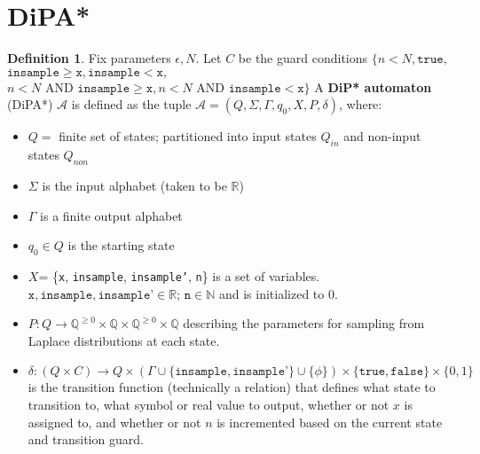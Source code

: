 \documentclass[12pt]{article}
\newcommand{\NN}{\mathbb{N}}
\newcommand{\QQ}{\mathbb{Q}}
\newcommand{\RR}{\mathbb{R}}
\newcommand{\gguard}{\texttt{insample}\geq \texttt{x}}
\newcommand{\lguard}{\texttt{insample} < \texttt{x}}
\newcommand{\gaguard}{n<N \text{ AND } \texttt{insample} \geq \texttt{x}}
\newcommand{\laguard}{n<N\text{ AND }\texttt{insample} < \texttt{x}}
\theoremstyle{definition}
\newtheorem{defn}[thm]{Definition}
\begin{document}
\section{DiPA*}

\begin{defn} Fix parameters $\epsilon, N$. Let $C$ be the guard conditions $\{n<N,\texttt{true},$ $\gguard, \lguard,$ $\gaguard, \laguard \}$ A \textbf{DiP* automaton} (DiPA*) $\mathcal{A}$ is defined as the tuple $\mathcal{A} = (Q, \Sigma, \Gamma, q_0, X, P, \delta)$, where:
\begin{itemize}
	\item $Q = $ finite set of states; partitioned into input states $Q_{in}$ and non-input states $Q_{non}$
	\item $\Sigma$ is the input alphabet (taken to be $\RR$)
	\item $\Gamma$ is a finite output alphabet
	\item $q_0\in Q$ is the starting state
	\item $X$= \{\texttt{x}, \texttt{insample}, \texttt{insample'}, \texttt{n}\} is a set of variables. $\texttt{x}, \texttt{insample}, \texttt{insample'} \in \RR$; $\texttt{n} \in \NN$ and is initialized to 0.
	\item $P: Q \to \QQ^{\geq 0} \times \QQ \times \QQ^{\geq 0} \times \QQ$ describing the parameters for sampling from Laplace distributions at each state.
	\item $\delta: (Q \times C) \to Q\times (\Gamma \cup \{\texttt{insample}, \texttt{insample'}\}\cup \{\phi\}) \times \{\texttt{true}, \texttt{false}\} \times \{0, 1\}$ is the transition function (technically a relation) that defines what state to transition to, what symbol or real value to output, whether or not $x$ is assigned to, and whether or not $n$ is incremented based on the current state and transition guard.
\end{itemize}
\end{defn}
\end{document}

